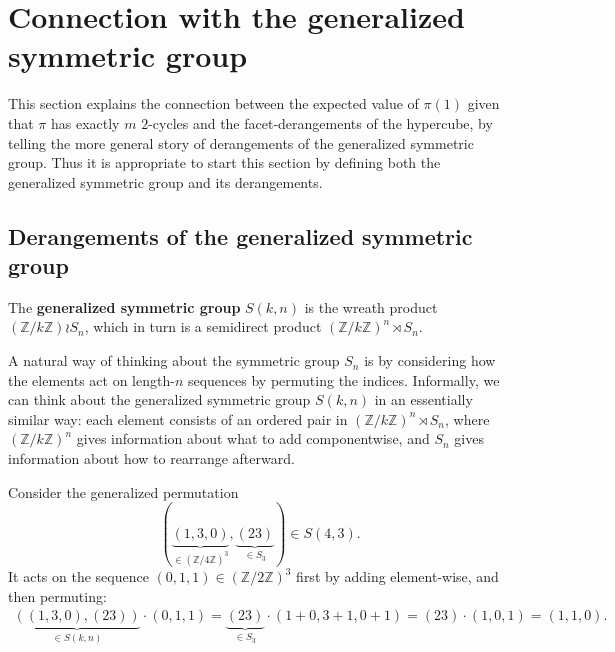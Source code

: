 \section{Connection with the generalized symmetric group}
\label{section:wreathProduct}
This section explains the connection between the expected value of $\pi(1)$
given that $\pi$ has exactly $m$ $2$-cycles and the facet-derangements of the
hypercube, by telling the more general story of derangements of the generalized
symmetric group. Thus it is appropriate to start this section by defining
both the generalized symmetric group and its derangements.

\subsection{Derangements of the generalized symmetric group}
\begin{definition}
  The \textbf{generalized symmetric group} $S(k,n)$ is the wreath product
  $(\mathbb{Z}/k\mathbb{Z}) \wr S_n$, which in turn is a semidirect product
  $(\mathbb{Z}/k\mathbb{Z})^n \rtimes S_n$.
\end{definition}


A natural way of thinking about the symmetric group $S_n$ is by considering
how the elements act on length-$n$ sequences by permuting the indices.
Informally, we can think about the generalized symmetric group $S(k,n)$ in an
essentially similar way: each element consists of an ordered pair in
$(\mathbb{Z}/k\mathbb{Z})^n \rtimes S_n$, where $(\mathbb{Z}/k\mathbb{Z})^n$ gives information about
what to add componentwise, and $S_n$ gives information about how to rearrange
afterward.

\begin{example}
  Consider the generalized permutation \[
    (\underbrace{(1,3,0)}_{\in (\mathbb{Z}/4\mathbb{Z})^3}, \underbrace{(23)}_{\in S_3}) \in S(4,3).
  \]
  It acts on the sequence $(0,1,1) \in (\mathbb{Z}/2\mathbb{Z})^3$ first by adding
  element-wise, and then permuting: \begin{align}
    \underbrace{((1,3,0),(23))}_{\in S(k,n)} \cdot (0,1,1)
    = \underbrace{(23)}_{\in S_3} \cdot (1+0,3+1,0+1)
    = (23) \cdot (1,0,1)
    = (1,1,0).
  \end{align}
\end{example}

